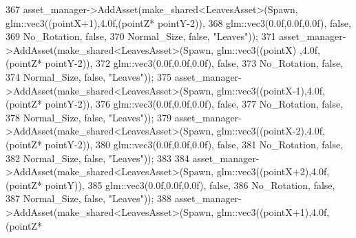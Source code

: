 \begin{DoxyCode}
367             asset\_manager->AddAsset(make\_shared<LeavesAsset>(Spawn, glm::vec3((pointX+1),4.0f,(pointZ*
      pointY-2)),
368                                                              glm::vec3(0.0f,0.0f,0.0f), \textcolor{keyword}{false},
369                                                              No\_Rotation, \textcolor{keyword}{false},
370                                                              Normal\_Size, \textcolor{keyword}{false}, \textcolor{stringliteral}{"Leaves"}));
371             asset\_manager->AddAsset(make\_shared<LeavesAsset>(Spawn, glm::vec3((pointX)  ,4.0f,(pointZ*
      pointY-2)),
372                                                              glm::vec3(0.0f,0.0f,0.0f), \textcolor{keyword}{false},
373                                                              No\_Rotation, \textcolor{keyword}{false},
374                                                              Normal\_Size, \textcolor{keyword}{false}, \textcolor{stringliteral}{"Leaves"}));
375             asset\_manager->AddAsset(make\_shared<LeavesAsset>(Spawn, glm::vec3((pointX-1),4.0f,(pointZ*
      pointY-2)),
376                                                              glm::vec3(0.0f,0.0f,0.0f), \textcolor{keyword}{false},
377                                                              No\_Rotation, \textcolor{keyword}{false},
378                                                              Normal\_Size, \textcolor{keyword}{false}, \textcolor{stringliteral}{"Leaves"}));
379             asset\_manager->AddAsset(make\_shared<LeavesAsset>(Spawn, glm::vec3((pointX-2),4.0f,(pointZ*
      pointY-2)),
380                                                              glm::vec3(0.0f,0.0f,0.0f), \textcolor{keyword}{false},
381                                                              No\_Rotation, \textcolor{keyword}{false},
382                                                              Normal\_Size, \textcolor{keyword}{false}, \textcolor{stringliteral}{"Leaves"}));
383  
384             asset\_manager->AddAsset(make\_shared<LeavesAsset>(Spawn, glm::vec3((pointX+2),4.0f,(pointZ*
      pointY)),
385                                                              glm::vec3(0.0f,0.0f,0.0f), \textcolor{keyword}{false},
386                                                              No\_Rotation, \textcolor{keyword}{false},
387                                                              Normal\_Size, \textcolor{keyword}{false}, \textcolor{stringliteral}{"Leaves"}));
388             asset\_manager->AddAsset(make\_shared<LeavesAsset>(Spawn, glm::vec3((pointX+1),4.0f,(pointZ*

\end{DoxyCode}
